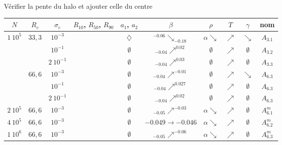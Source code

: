 \begin{table}[htbp]
	Vérifier la pente du halo et ajouter celle du centre
	\centering
		\begin{tabular}{|c|c|c|c|c|c|c|c|c|c|}
			\hline $N$ & $R_c$ & $\sigma_c$ & $R_{10}$, $R_{50}$, $R_{90}$ & $a_1$, $a_2$ & $\beta$ & $\rho$ & $T$ & $\gamma$ & nom \tabularnewline
			\hline
			\hline \multirow{6}{*}{$1\ 10^5$} & \multirow{3}{*}{$33,3$}
			& $10^{-3}$ & \accretionmoyen{} & $\diamondsuit$ & ${}^{-0.06}\searrow_{-0.18}$ & $\alpha\searrow$ & $\nearrow$ & $\searrow$ & $A_{3.1}$ \tabularnewline \cline{3-10}
					& & $10^{-1}$ & \accretionpeu{} & $\emptyset$ & ${}_{-0.04}\nearrow^{0.02}$ & $\emptyset$ & $\nearrow$ & $\emptyset$ & $A_{3.2}$  \tabularnewline \cline{3-10}
					& & $2\ 10^{-1}$ & \accretionpeu{} & $\emptyset$ & ${}_{-0.04}\nearrow^{0.03}$ & $\emptyset$ & $\nearrow$ & $\emptyset$ & $A_{3.3}$  \tabularnewline \cline{2-10}
				& \multirow{3}{*}{$66,6$}
					& $10^{-3}$ & \accretionpeu{} & $\emptyset$ & ${}_{-0.04}\nearrow^{-0.01}$ & $\emptyset$ & $\nearrow$ & $\searrow$ & $A_{6.3}$  \tabularnewline \cline{3-10}
					& & $10^{-1}$ & \accretionpeu{} & $\emptyset$ & ${}_{-0.04}\nearrow^{0.027}$ & $\emptyset$ & $\nearrow$ & $\emptyset$ & $A_{6.3}$  \tabularnewline \cline{3-10}
					& & $2\ 10^{-1}$ & \accretionpeu{} & $\emptyset$ & ${}_{-0.04}\nearrow^{0.02}$ & $\emptyset$ & $\nearrow$ & $\emptyset$ & $A_{6.3}$  \tabularnewline \cline{2-10}
			\hline
			\hline $2\ 10^5$ & $66,6$ & $10^{-3}$ & \accretionpeu{} & $\emptyset$ & ${}_{-0.05}\nearrow^{-0.03}$ & $\alpha\searrow$ & $\nearrow$ & $\emptyset$ & $A_{6.1}^m$  \\
			\hline
			\hline $4\ 10^5$ & $66,6$ & $10^{-3}$ & \accretionpeu{} & $\emptyset$ & ${\scriptstyle -0.049}\to{\scriptstyle -0.046}$ & $\alpha\searrow$ & $\nearrow$ & $\emptyset$ & $A_{6.2}^m$  \\
			\hline
			\hline $1\ 10^6$ & $66,6$ & $10^{-3}$ & \accretionpeu{} & $\emptyset$ & ${}_{-0.05}\nearrow^{-0.06}$ & $\alpha\searrow$ & $\nearrow$ & $\emptyset$ & $A_{6.3}^m$  \\

\end{tabular}
\end{table}

